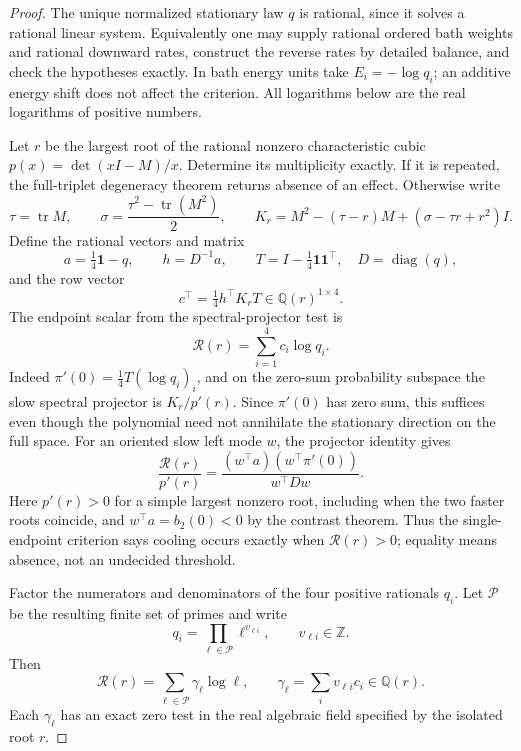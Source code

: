 \documentclass[11pt]{article}
\begin{document}
\begin{proof}
The unique normalized stationary law $q$ is rational, since it solves a
rational linear system. Equivalently one may supply rational ordered bath
weights and rational downward rates, construct the reverse rates by detailed
balance, and check the hypotheses exactly. In bath energy units take
$E_i=-\log q_i$; an additive energy shift does not affect the criterion.
All logarithms below are the real logarithms of positive numbers.

Let $r$ be the largest root of the rational nonzero characteristic cubic
$p(x)=\det(xI-M)/x$. Determine its multiplicity exactly. If it is repeated,
the full-triplet degeneracy theorem returns absence of an effect. Otherwise
write
\[
\tau=\operatorname{tr}M,\qquad
\sigma=\frac{\tau^2-\operatorname{tr}(M^2)}2,\qquad
K_r=M^2-(\tau-r)M+(\sigma-\tau r+r^2)I.
\]
Define the rational vectors and matrix
\[
a=\tfrac14\mathbf1-q,\qquad h=D^{-1}a,\qquad
T=I-\tfrac14\mathbf1\mathbf1^\top,
\quad D=\operatorname{diag}(q),
\]
and the row vector
\[
c^\top=\tfrac14 h^\top K_r T\in\mathbb Q(r)^{1\times4}.
\]
The endpoint scalar from the spectral-projector test is
\begin{equation}\label{eq:rationalprimelog}
\mathcal R(r)=\sum_{i=1}^4c_i\log q_i.
\end{equation}
Indeed $\pi'(0)=\tfrac14T(\log q_i)_i$, and on the zero-sum probability
subspace the slow spectral projector is $K_r/p'(r)$. Since $\pi'(0)$
has zero sum, this suffices even though the polynomial need not annihilate
the stationary direction on the full space. For an oriented slow left mode
$w$, the projector identity gives
\[
\frac{\mathcal R(r)}{p'(r)}
=\frac{(w^\top a)(w^\top\pi'(0))}{w^\top Dw}.
\]
Here $p'(r)>0$ for a simple largest nonzero root, including when the two
faster roots coincide, and $w^\top a=b_2(0)<0$ by the contrast theorem.
Thus the single-endpoint criterion says cooling occurs exactly when
$\mathcal R(r)>0$; equality means absence, not an undecided threshold.

Factor the numerators and denominators of the four positive rationals $q_i$.
Let $\mathcal P$ be the resulting finite set of primes and write
\[
q_i=\prod_{\ell\in\mathcal P}\ell^{v_{\ell i}},
\qquad v_{\ell i}\in\mathbb Z.
\]
Then
\[
\mathcal R(r)=\sum_{\ell\in\mathcal P}\gamma_\ell\log\ell,
\qquad
\gamma_\ell=\sum_i v_{\ell i}c_i\in\mathbb Q(r).
\]
Each $\gamma_\ell$ has an exact zero test in the real algebraic field
specified by the isolated root $r$.


\end{proof}
\end{document}
